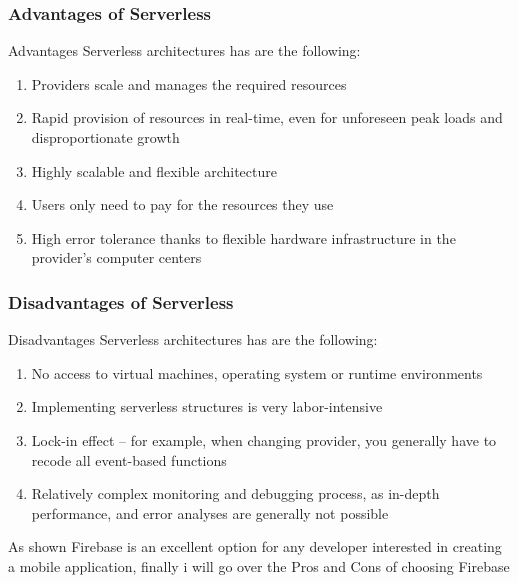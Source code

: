 \subsubsection{Advantages of Serverless}
Advantages Serverless architectures has are the following:
\begin{enumerate}
  \item Providers scale and manages the required resources
  \item Rapid provision of resources in real-time, even for unforeseen peak loads and disproportionate growth
  \item Highly scalable and flexible architecture
  \item Users only need to pay for the resources they use
  \item High error tolerance thanks to flexible hardware infrastructure in the provider’s computer centers
\end{enumerate}

\subsubsection{Disadvantages of Serverless}
Disadvantages Serverless architectures has are the following:
\begin{enumerate}
  \item No access to virtual machines, operating system or runtime environments
  \item Implementing serverless structures is very labor-intensive
  \item Lock-in effect – for example, when changing provider, you generally have to recode all event-based functions
  \item Relatively complex monitoring and debugging process, as in-depth performance, and error analyses are generally not possible
\end{enumerate}
\newpage

As shown Firebase is an excellent option for any developer interested in creating a mobile application, finally i will go over the Pros and Cons of choosing Firebase

